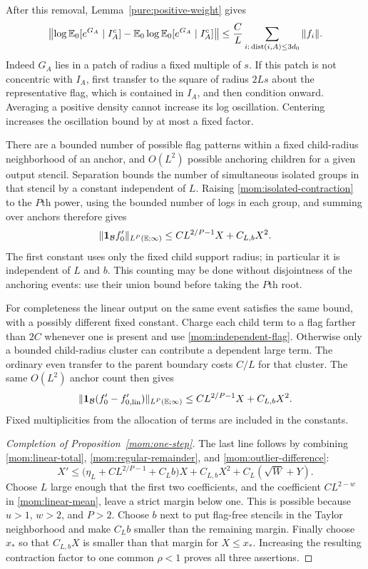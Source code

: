 After this removal, Lemma~\ref{pure:positive-weight} gives
\begin{equation}\label{mom:isolated-contraction}
 \left\|\log\mathbb E_0[e^{G_A}\mid I_A^c]
       -\mathbb E_0\log\mathbb E_0[e^{G_A}\mid I_A^c]\right\|
 \le \frac{C}{L}\sum_{i:\,\operatorname{dist}(i,A)\le3d_0}\|f_i\|.
\end{equation}
Indeed $G_A$ lies in a patch of radius a fixed multiple of $s$.
If this patch is not concentric with $I_A$, first transfer to the square
of radius $2Ls$ about the representative flag, which is contained in
$I_A$, and then condition onward.  Averaging a positive density cannot
increase its log oscillation.  Centering increases the oscillation
bound by at most a fixed factor.

There are a bounded number of possible flag patterns within a fixed
child-radius neighborhood of an anchor, and $O(L^2)$ possible anchoring
children for a given output stencil.  Separation bounds the number of
simultaneous isolated groups in that stencil by a constant independent
of $L$.  Raising \eqref{mom:isolated-contraction} to the $P$th power,
using the bounded number of logs in each group, and summing over anchors
therefore gives
\begin{equation}\label{mom:outlier-output}
 \|\mathbf 1_{\mathcal B}f'_0\|_{L^P(\mathbb E;\infty)}
 \le CL^{2/P-1}X+C_{L,b}X^2.
\end{equation}
The first constant uses only the fixed child support radius; in
particular it is independent of $L$ and $b$.  This counting may be done
without disjointness of the anchoring events: use their union bound
before taking the $P$th root.

For completeness the linear output on the same event satisfies the
same bound, with a possibly different fixed constant.  Charge each
child term to a flag farther than $2C$ whenever one is present and use
\eqref{mom:independent-flag}.  Otherwise only a bounded child-radius
cluster can contribute a dependent large term.  The ordinary even
transfer to the parent boundary costs $C/L$ for that cluster.  The same
$O(L^2)$ anchor count then gives
\begin{equation}\label{mom:outlier-difference}
 \|\mathbf 1_{\mathcal B}(f'_0-f'_{0,\mathrm{lin}})\|_{L^P(\mathbb E;\infty)}
 \le CL^{2/P-1}X+C_{L,b}X^2.
\end{equation}
Fixed multiplicities from the allocation of terms are included in the
constants.

\begin{proof}[Completion of Proposition~\ref{mom:one-step}]
The last line follows by combining \eqref{mom:linear-total},
\eqref{mom:regular-remainder}, and
\eqref{mom:outlier-difference}:
\[
 X'\le\bigl(\eta_L+CL^{2/P-1}+C_Lb\bigr)X
       +C_{L,b}X^2+C_L(\sqrt W+Y).
\]
Choose $L$ large enough that the first two coefficients, and the
coefficient $CL^{2-w}$ in \eqref{mom:linear-mean}, leave a strict margin
below one.  This is possible because $u>1$, $w>2$, and $P>2$.
Choose $b$ next to put flag-free stencils in the Taylor neighborhood
and make $C_Lb$ smaller than the remaining margin.  Finally choose
$x_*$ so that $C_{L,b}X$ is smaller than that margin for $X\le x_*$.
Increasing the resulting contraction factor to one common $\rho<1$
proves all three assertions.
\end{proof}

